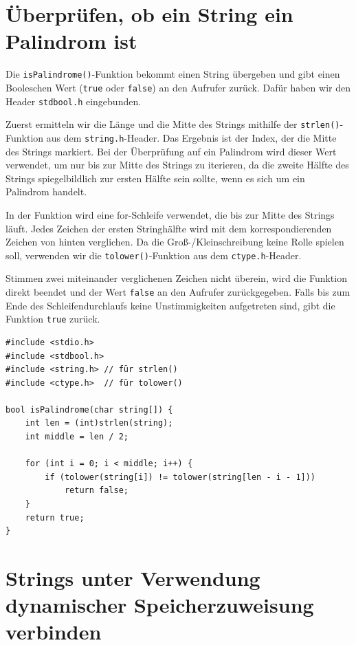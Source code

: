 \chapter{Überprüfen, ob ein String ein Palindrom ist}

Die \texttt{isPalindrome()}-Funktion bekommt einen String übergeben und
gibt einen Booleschen Wert (\texttt{true} oder \texttt{false}) an
den Aufrufer zurück. Dafür haben wir den Header \texttt{stdbool.h}
eingebunden.

Zuerst ermitteln wir die Länge und die Mitte des Strings mithilfe der
\texttt{strlen()}-Funktion aus dem \texttt{string.h}-Header. Das
Ergebnis ist der Index, der die Mitte des Strings markiert. Bei der Überprüfung
auf ein Palindrom wird dieser Wert verwendet, um nur bis zur Mitte des Strings
zu iterieren, da die zweite Hälfte des Strings spiegelbildlich zur ersten Hälfte
sein sollte, wenn es sich um ein Palindrom handelt.

In der Funktion wird eine for-Schleife verwendet, die bis zur Mitte des Strings
läuft. Jedes Zeichen der ersten Stringhälfte wird mit dem korrespondierenden
Zeichen von hinten verglichen. Da die Groß-/Kleinschreibung keine Rolle spielen
soll, verwenden wir die \texttt{tolower()}-Funktion aus dem
\texttt{ctype.h}-Header.

Stimmen zwei miteinander verglichenen Zeichen nicht überein, wird die Funktion
direkt beendet und der Wert \texttt{false} an den Aufrufer zurückgegeben.
Falls bis zum Ende des Schleifendurchlaufs keine Unstimmigkeiten aufgetreten
sind, gibt die Funktion \texttt{true} zurück.

\begin{verbatim}
#include <stdio.h>
#include <stdbool.h>
#include <string.h> // für strlen()
#include <ctype.h>  // für tolower()

bool isPalindrome(char string[]) {
    int len = (int)strlen(string);
    int middle = len / 2;

    for (int i = 0; i < middle; i++) {
        if (tolower(string[i]) != tolower(string[len - i - 1]))
            return false;
    }
    return true;
}
\end{verbatim}



\chapter{Strings unter Verwendung dynamischer Speicherzuweisung verbinden}

